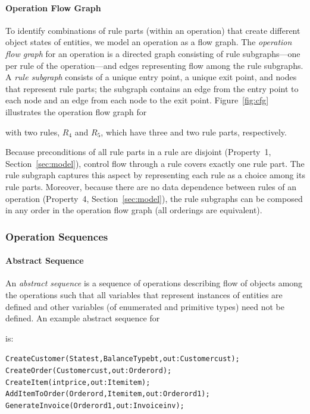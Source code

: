 \vskip -7pt
\paragraph*{Operation Flow Graph} To identify combinations of rule parts (within
an operation) that create different object states of entities, we model an
operation as a flow graph. The \textit{operation flow graph} for an operation is
a directed graph consisting of rule subgraphs---one per rule of the
operation---and edges representing flow among the rule subgraphs. A \textit{rule
  subgraph} consists of a unique entry point, a unique exit point, and nodes
that represent rule parts; the subgraph contains an edge from the entry point to
each node and an edge from each node to the exit point.  Figure~\ref{fig:cfg}
illustrates the operation flow graph for \subject{GenerateInvoice} with two
rules, $R_4$ and $R_5$, which have three and two rule parts, respectively.

Because preconditions of all rule parts in a rule are disjoint (Property~1,
Section~\ref{sec:model}), control flow through a rule covers exactly one rule
part.  The rule subgraph captures this aspect by representing each rule as a
choice among its rule parts. Moreover, because there are no data dependence
between rules of an operation (Property~4, Section~\ref{sec:model}), the rule
subgraphs can be composed in any order in the operation flow graph (\ie all
orderings are equivalent).

\subsubsection{Operation Sequences}

\vskip -10pt
\paragraph*{Abstract Sequence} An \textit{abstract sequence} is a sequence of
operations describing flow of objects among the operations such that all
variables that represent instances of entities are defined and other variables
(of enumerated and primitive types) need not be defined. An example abstract
sequence for \subject{GenerateInvoice} is:

\vspace*{-4pt}
{\scriptsize
\begin{alltt}
 CreateCustomer(State st, BalanceType bt, out: Customer cust);
 CreateOrder(Customer cust, out: Order ord);	
 CreateItem(int price, out: Item item);
 AddItemToOrder(Order ord, Item item, out: Order ord1);
 GenerateInvoice(Order ord1, out: Invoice inv);  
\end{alltt}
}
\vspace*{-5pt}

